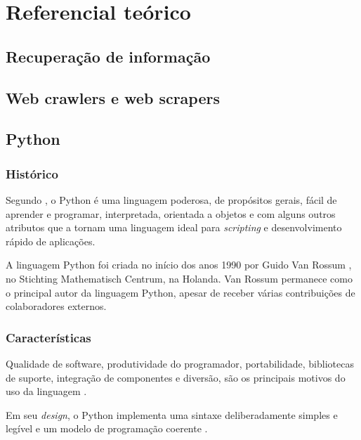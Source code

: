 
\pagebreak
\chapter{Referencial teórico}

\pagebreak
\section{Recuperação de informação}

\pagebreak
\section{Web crawlers e web scrapers}

\pagebreak
\section{Python}

\subsection{Histórico}
Segundo \cite{pythondoc}, o Python é uma linguagem poderosa, de propósitos gerais, fácil de aprender e programar, interpretada, orientada a objetos e com alguns outros atributos que a tornam uma linguagem ideal para \emph{scripting} e desenvolvimento rápido de aplicações.

A linguagem Python foi criada no início dos anos 1990 por Guido Van Rossum \cite{pythonlicense}, no Stichting Mathematisch Centrum, na Holanda. Van Rossum permanece como o principal autor da linguagem Python, apesar de receber várias contribuições de colaboradores externos.

\subsection{Características}
Qualidade de software, produtividade do programador, portabilidade, bibliotecas de suporte, integração de componentes e diversão, são os principais motivos do uso da linguagem \cite{learningpython}. %

Em seu \emph{design}, o Python implementa uma sintaxe deliberadamente simples e legível e um modelo de programação coerente \cite{learningpython}. %

